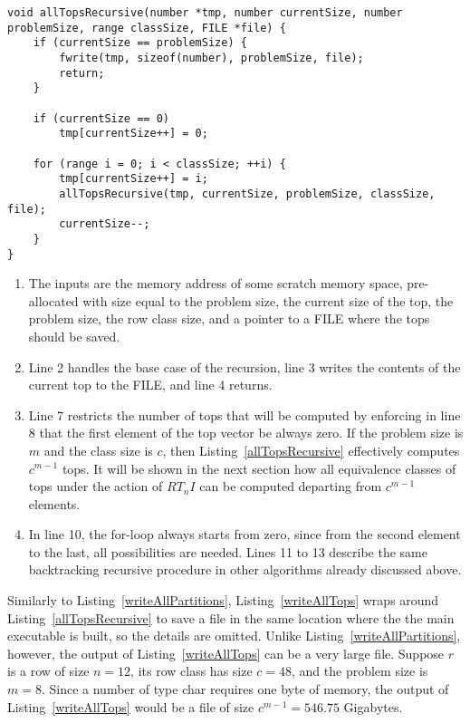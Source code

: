 \begin{lstlisting}[caption={Recursively computing all top vectors of a certain size.},label={allTopsRecursive}]
void allTopsRecursive(number *tmp, number currentSize, number problemSize, range classSize, FILE *file) {
    if (currentSize == problemSize) {
        fwrite(tmp, sizeof(number), problemSize, file);
        return;
    }

    if (currentSize == 0)
        tmp[currentSize++] = 0;

    for (range i = 0; i < classSize; ++i) {
        tmp[currentSize++] = i;
        allTopsRecursive(tmp, currentSize, problemSize, classSize, file);
        currentSize--;
    }
}
\end{lstlisting}

\begin{enumerate}
\item The inputs are the memory address of some scratch memory space, pre-allocated with size equal to the problem size, the current size of the top, the problem size, the row class size, and a pointer to a FILE where the tops should be saved.
\item Line 2 handles the base case of the recursion, line 3 writes the contents of the current top to the FILE, and line 4 returns.
\addtocounter{enumi}{5}
\item Line 7 restricts the number of tops that will be computed by enforcing in line 8 that the first element of the top vector be always zero. If the problem size is $m$ and the class size is $c$, then Listing~\ref{allTopsRecursive} effectively computes $c^{m - 1}$ tops. It will be shown in the next section how all equivalence classes of tops under the action of $RT_nI$ can be computed departing from $c^{m - 1}$ elements.
\addtocounter{enumi}{2}
\item In line 10, the for-loop always starts from zero, since from the second element to the last, all possibilities are needed. Lines 11 to 13 describe the same backtracking recursive procedure in other algorithms already discussed above.
\end{enumerate}


Similarly to Listing~\ref{writeAllPartitions}, Listing~\ref{writeAllTops} wraps around Listing~\ref{allTopsRecursive} to save a file in the same location where the the main executable is built, so the details are omitted. Unlike Listing~\ref{writeAllPartitions}, however, the output of Listing~\ref{writeAllTops} can be a very large file. Suppose $r$ is a row of size $n = 12$, its row class has size $c = 48$, and the problem size is $m = 8$. Since a number of type char requires one byte of memory, the output of Listing~\ref{writeAllTops} would be a file of size $c^{m - 1} = 546.75$ Gigabytes.

